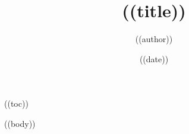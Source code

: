\documentclass[11pt,a4paper]{article}
\title{((title))}
\author{((author))}
\date{((date))}
\begin{document}
\maketitle

((toc))

((body))
\end{document}
